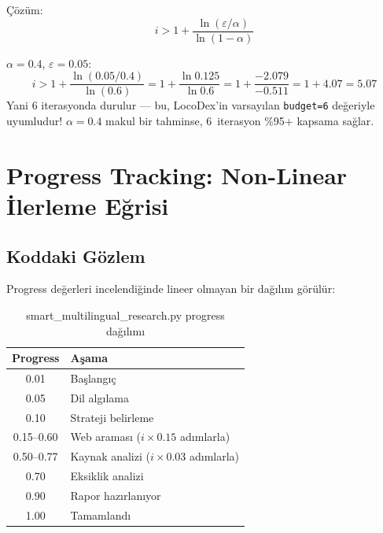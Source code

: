 \c{C}\"{o}z\"{u}m:
\begin{equation}
\label{eq:marginal_solution}
i > 1 + \frac{\ln(\varepsilon / \alpha)}{\ln(1 - \alpha)}
\end{equation}

\begin{ornek}
$\alpha = 0.4$, $\varepsilon = 0.05$:
\[
i > 1 + \frac{\ln(0.05/0.4)}{\ln(0.6)} = 1 + \frac{\ln 0.125}{\ln 0.6} = 1 + \frac{-2.079}{-0.511} = 1 + 4.07 = 5.07
\]
Yani 6 iterasyonda durulur --- bu, LocoDex'in varsay{\i}lan \texttt{budget=6} de\u{g}eriyle uyumludur! $\alpha = 0.4$ makul bir tahminse, 6~iterasyon \%95+ kapsama sa\u{g}lar.
\end{ornek}


\section{Progress Tracking: Non-Linear \.{I}lerleme E\u{g}risi}
\label{sec:progress}

\subsection{Koddaki G\"{o}zlem}

Progress de\u{g}erleri incelendi\u{g}inde lineer olmayan bir da\u{g}{\i}l{\i}m g\"{o}r\"{u}l\"{u}r:

\begin{table}[H]
\centering
\caption{smart\_multilingual\_research.py progress da\u{g}{\i}l{\i}m{\i}}
\label{tab:progress_values}
\begin{tabularx}{\textwidth}{cX}
\toprule
\color{chapterBlue}\textbf{Progress} & \color{chapterBlue}\textbf{A\c{s}ama} \\
\midrule
0.01 & Ba\c{s}lang{\i}\c{c} \\
0.05 & Dil alg{\i}lama \\
0.10 & Strateji belirleme \\
0.15--0.60 & Web aramas{\i} ($i \times 0.15$ ad{\i}mlarla) \\
0.50--0.77 & Kaynak analizi ($i \times 0.03$ ad{\i}mlarla) \\
0.70 & Eksiklik analizi \\
0.90 & Rapor haz{\i}rlan{\i}yor \\
1.00 & Tamamland{\i} \\
\bottomrule
\end{tabularx}
\end{table}

